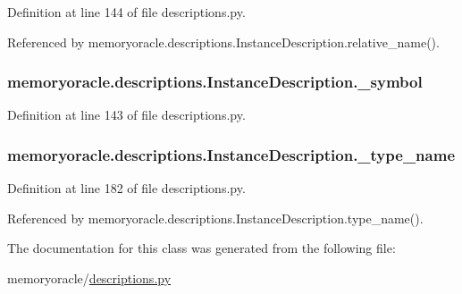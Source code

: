 Definition at line 144 of file descriptions.\+py.



Referenced by memoryoracle.\+descriptions.\+Instance\+Description.\+relative\+\_\+name().

\hypertarget{classmemoryoracle_1_1descriptions_1_1InstanceDescription_a1e2b63549184bf07f6dc523ac68f6f5f}{}
\subsubsection[{\+\_\+symbol}]{\setlength{\rightskip}{0pt plus 5cm}memoryoracle.\+descriptions.\+Instance\+Description.\+\_\+symbol\hspace{0.3cm}{\ttfamily [private]}}\label{classmemoryoracle_1_1descriptions_1_1InstanceDescription_a1e2b63549184bf07f6dc523ac68f6f5f}


Definition at line 143 of file descriptions.\+py.

\hypertarget{classmemoryoracle_1_1descriptions_1_1InstanceDescription_a4d1eff692c0720c4c3c567b89d34963c}{}
\subsubsection[{\+\_\+type\+\_\+name}]{\setlength{\rightskip}{0pt plus 5cm}memoryoracle.\+descriptions.\+Instance\+Description.\+\_\+type\+\_\+name\hspace{0.3cm}{\ttfamily [private]}}\label{classmemoryoracle_1_1descriptions_1_1InstanceDescription_a4d1eff692c0720c4c3c567b89d34963c}


Definition at line 182 of file descriptions.\+py.



Referenced by memoryoracle.\+descriptions.\+Instance\+Description.\+type\+\_\+name().



The documentation for this class was generated from the following file\+:\begin{DoxyCompactItemize}
\item 
memoryoracle/\hyperlink{descriptions_8py}{descriptions.\+py}\end{DoxyCompactItemize}
